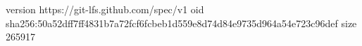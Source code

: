 version https://git-lfs.github.com/spec/v1
oid sha256:50a52dff7ff4831b7a72fcf6fcbeb1d559e8d74d84e9735d964a54e723c96def
size 265917
